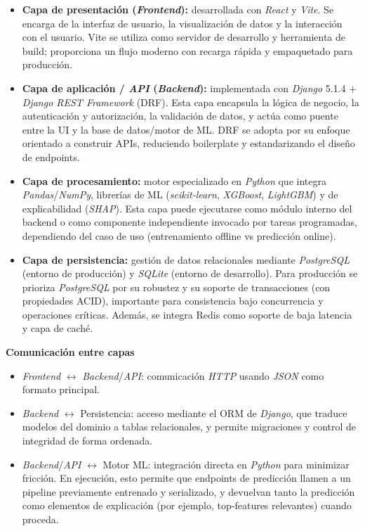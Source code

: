 \begin{itemize}
\item \textbf{Capa de presentación (\textit{Frontend}):} desarrollada con \textit{React} y \textit{Vite}. Se 
encarga de la interfaz de usuario, la visualización de datos y la interacción con 
el usuario. Vite se utiliza como servidor de desarrollo y herramienta de build; 
proporciona un flujo moderno con recarga rápida y empaquetado para producción.

\item \textbf{Capa de aplicación / \textit{API} (\textit{Backend}):} implementada con \textit{Django} 5.1.4 + 
\textit{Django REST Framework} (DRF). Esta capa encapsula la lógica de negocio, la 
autenticación y autorización, la validación de datos, y actúa como puente entre 
la UI y la base de datos/motor de ML. DRF se adopta por su enfoque orientado a 
construir APIs, reduciendo boilerplate y estandarizando el diseño de endpoints.

\item \textbf{Capa de procesamiento:} motor especializado en \textit{Python} que integra 
\textit{Pandas}/\textit{NumPy}, librerías de ML (\textit{scikit-learn}, \textit{XGBoost}, \textit{LightGBM}) y de explicabilidad 
(\textit{SHAP}). Esta capa puede ejecutarse como módulo interno del backend o como 
componente independiente invocado por tareas programadas, dependiendo del caso de 
uso (entrenamiento offline vs predicción online).

\item \textbf{Capa de persistencia:} gestión de datos relacionales mediante 
\textit{PostgreSQL} (entorno de producción) y \textit{SQLite} (entorno de desarrollo). Para 
producción se prioriza \textit{PostgreSQL} por su robustez y su soporte de transacciones 
(con propiedades ACID), importante para consistencia bajo concurrencia y operaciones 
críticas. Además, se integra Redis como soporte de baja latencia y capa de caché.
\end{itemize}

\textbf{Comunicación entre capas}

\begin{itemize}
\item \textit{Frontend} $\leftrightarrow$ \textit{Backend}/\textit{API}: comunicación \textit{HTTP} usando \textit{JSON} como 
formato principal.

\item \textit{Backend} $\leftrightarrow$ Persistencia: acceso mediante el ORM de \textit{Django}, que 
traduce modelos del dominio a tablas relacionales, y permite migraciones y control 
de integridad de forma ordenada.

\item \textit{Backend}/\textit{API} $\leftrightarrow$ Motor ML: integración directa en \textit{Python} para 
minimizar fricción. En ejecución, esto permite que endpoints de predicción llamen 
a un pipeline previamente entrenado y serializado, y devuelvan tanto la predicción 
como elementos de explicación (por ejemplo, top‑features relevantes) cuando proceda.
\end{itemize}

